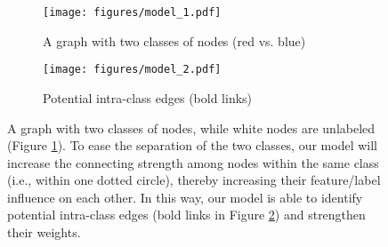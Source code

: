 \documentclass{article}
\begin{document}
		\begin{figure}
			\centering
			\captionsetup[subfigure]{justification=centering}
			\begin{subfigure}[b]{0.22\textwidth}
   				\texttt{[image: figures/model\_1.pdf]}
   				\caption{A graph with two classes of nodes (red vs. blue)}
   				\label{fig:model_1}
			\end{subfigure}
			\hfill
			\begin{subfigure}[b]{0.22\textwidth}
				\texttt{[image: figures/model\_2.pdf]}
				\caption{Potential intra-class edges (bold links)}
				\label{fig:model_2}
			\end{subfigure}
			\caption{A graph with two classes of nodes, while white nodes are unlabeled (Figure \ref{fig:model_1}). To ease the separation of the two classes, our model will increase the connecting strength among nodes within the same class (i.e., within one dotted circle), thereby increasing their feature/label influence on each other. In this way, our model is able to identify potential intra-class edges (bold links in Figure \ref{fig:model_2}) and strengthen their weights.}
			\label{fig:model}
		\end{figure}
		
\end{document}
